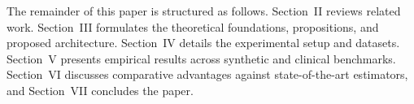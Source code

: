 The remainder of this paper is structured as follows. Section~II reviews related work. Section~III formulates the theoretical foundations, propositions, and proposed architecture. Section~IV details the experimental setup and datasets. Section~V presents empirical results across synthetic and clinical benchmarks. Section~VI discusses comparative advantages against state-of-the-art estimators, and Section~VII concludes the paper.
